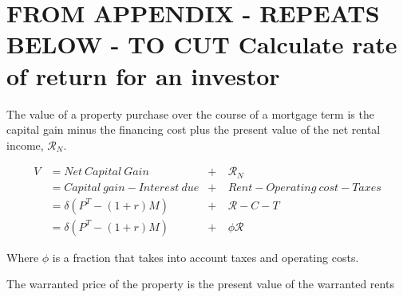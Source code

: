 


\section{FROM APPENDIX - REPEATS BELOW - TO CUT Calculate rate of return for an investor}
The value of a property purchase over the course of a mortgage term is the \gls{capital gain} minus the financing cost plus the \gls{present value} of the net rental income, $\mathcal{R}_N$. 



\begin{align}
V  	& = Net\ Capital\ Gain & +\ & \mathcal{R}_N \\
    & =  Capital\ gain - Interest\ due      &+\ &   Rent  - Operating\ cost - Taxes \nonumber \\
    &= \delta(P^T- (1+r)M)  & +\ & \mathcal{R} -C - T  \\
    &= \delta(P^T- (1+r)M)  & +\ & \phi\mathcal{R}\label{eq:Value}
\end{align}

Where $\phi$ is a fraction that takes into account taxes and operating costs. 


 The warranted price of the property is the present value of the \gls{warranted rents}
 

